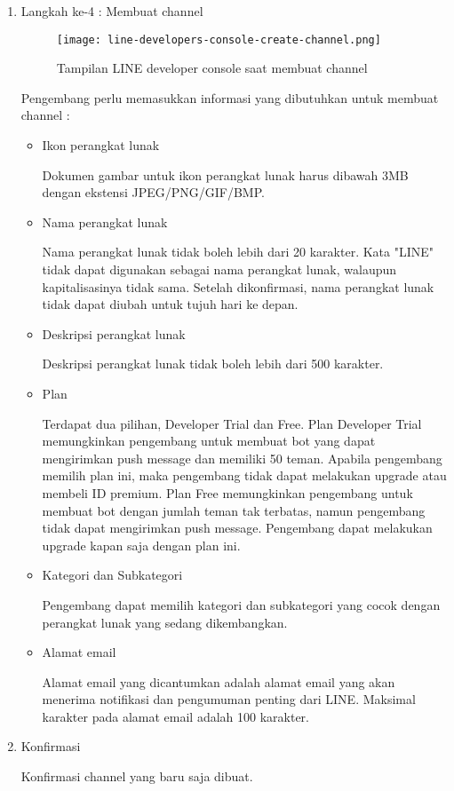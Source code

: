 \begin{enumerate}
\item Langkah ke-4 : Membuat channel
\begin{figure}[H]
	\centering  
	\texttt{[image: line-developers-console-create-channel.png]}  
	\caption[Tampilan LINE developer console saat membuat channel]{Tampilan LINE developer console saat membuat channel} 
	\label{fig:line-developers-console-create-channel} 
\end{figure}

Pengembang perlu memasukkan informasi yang dibutuhkan untuk membuat channel :
\begin{itemize}
\item Ikon perangkat lunak

Dokumen gambar untuk ikon perangkat lunak harus dibawah 3MB dengan ekstensi JPEG/PNG/GIF/BMP.

\item Nama perangkat lunak

Nama perangkat lunak tidak boleh lebih dari 20 karakter. Kata "LINE" tidak dapat digunakan sebagai nama perangkat lunak, walaupun kapitalisasinya tidak sama. Setelah dikonfirmasi, nama perangkat lunak tidak dapat diubah untuk tujuh hari ke depan.

\item Deskripsi perangkat lunak

Deskripsi perangkat lunak tidak boleh lebih dari 500 karakter.

\item Plan

Terdapat dua pilihan, Developer Trial dan Free. Plan Developer Trial memungkinkan pengembang untuk membuat bot yang dapat mengirimkan push message dan memiliki 50 teman. Apabila pengembang memilih plan ini, maka pengembang tidak dapat melakukan upgrade atau membeli ID premium. Plan Free memungkinkan pengembang untuk membuat bot dengan jumlah teman tak terbatas, namun pengembang tidak dapat mengirimkan push message. Pengembang dapat melakukan upgrade kapan saja dengan plan ini.

\item Kategori dan Subkategori

Pengembang dapat memilih kategori dan subkategori yang cocok dengan perangkat lunak yang sedang dikembangkan.

\item Alamat email

Alamat email yang dicantumkan adalah alamat email yang akan menerima notifikasi dan pengumuman penting dari LINE. Maksimal karakter pada alamat email adalah 100 karakter.

\end{itemize}

\item Konfirmasi

Konfirmasi channel yang baru saja dibuat.

\end{enumerate}


